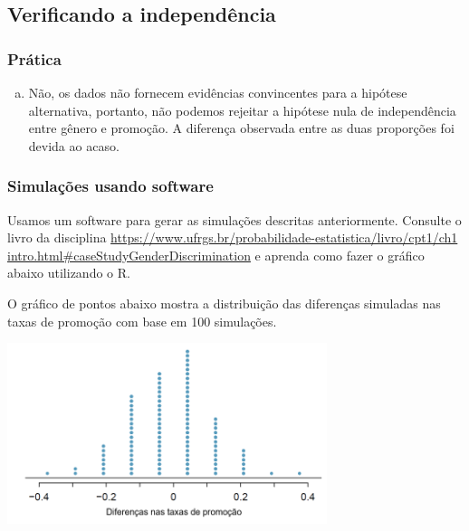 
\subsection{Verificando a independência}


\begin{frame}
\frametitle{Prática}
\justifying
{}

\begin{enumerate}[(a)]
\justifying
\item Não, os dados não fornecem evidências convincentes para a hipótese alternativa, portanto, não podemos rejeitar a hipótese nula de independência entre gênero e promoção. A diferença observada entre as duas proporções foi devida ao acaso.
\justifying
{}
\end{enumerate}

\end{frame}


\begin{frame}
\frametitle{Simulações usando software}
\justifying
Usamos um software para gerar as simulações descritas anteriormente. Consulte o livro da disciplina 
\href{https://www.ufrgs.br/probabilidade-estatistica/livro/cpt1/ch1_intro.html#caseStudyGenderDiscrimination}{https://www.ufrgs.br/probabilidade-estatistica/livro/cpt1/ch1 intro.html#caseStudyGenderDiscrimination} e aprenda como fazer o gráfico abaixo utilizando o R.

O gráfico de pontos abaixo mostra a distribuição das diferenças simuladas nas taxas de promoção com base em 100 simulações.

\begin{center}
\includegraphics[width=0.7\textwidth]{1-8_gender_discrimination/discRandDotPlot.png}
\end{center}

\end{frame}


